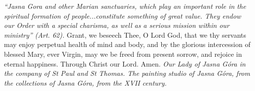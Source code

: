 \pagestyle{empty}
\hspace{0pt}
\vfill

\textit{``Jasna Gora and other Marian sanctuaries, which play an
important role in the spiritual formation of people...constitute
something of great value. They endow our Order with a special
charisma, as well as a serious mission within our ministry'' (Art.
62).}
\medbreak
Grant, we beseech Thee, O Lord God, that we thy servants may enjoy perpetual health of mind and body, and by the glorious intercession of blessed Mary, ever Virgin, may we be freed from present sorrow, and rejoice in eternal happiness. Through Christ our Lord. Amen.
\vfill
\textit{Our Lady of Jasna Góra in the company of St Paul and St Thomas. The painting studio of Jasna Góra, from the collections of Jasna Góra, from the XVII century.}
\hspace{0pt}
\newpage
